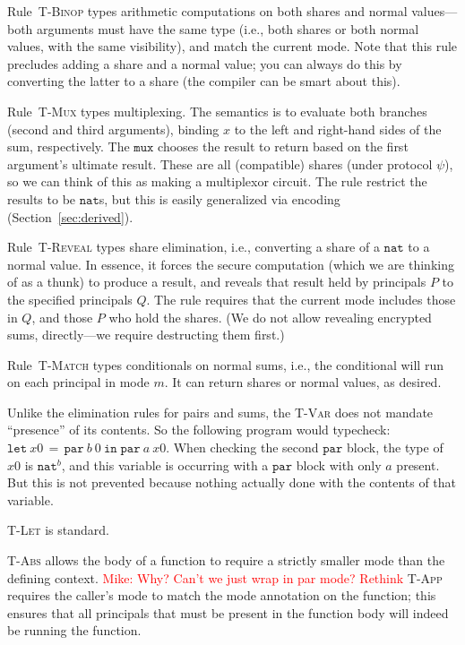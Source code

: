 \documentclass[10pt]{article}
\newcommand{\rulelab}[1]{{\small \textsc{#1}}}
\newcommand{\kw}[1]{\ensuremath{\mathtt{#1}}}
\newcommand{\tnat}{\ensuremath{\mathtt{nat}}}
\newcommand{\elet}[3]{\ensuremath{\kw{let}~#1\, =\, #2~\kw{in}\;{#3}}}
\newcommand{\epar}[2]{\ensuremath{\kw{par}~{#1}~{#2}}}
\newcommand{\mwh}[1]{\textcolor{red}{Mike: #1}}
\begin{document}
Rule~\rulelab{T-Binop} types arithmetic computations on both shares
and normal values---both arguments must have the same type (i.e., both
shares or both normal values, with the same visibility), and match the
current mode. Note that this rule precludes adding a 
share and a normal value; you can always do this by converting the
latter to a share (the compiler can be smart about this).

Rule~\rulelab{T-Mux} types multiplexing. The semantics is to evaluate
both branches (second and third arguments), binding $x$ to the left
and right-hand sides of the sum, respectively. The $\kw{mux}$ chooses
the result to return based on the first argument's ultimate
result. These are all (compatible) shares (under protocol $\psi$), so
we can think of this as making a multiplexor circuit. The rule
restrict the results to be $\tnat$s, but this is easily generalized
via encoding (Section~\ref{sec:derived}).

Rule~\rulelab{T-Reveal} types share elimination, i.e., converting a
share of a $\tnat$ to a normal value. In essence, it forces the secure
computation (which we are thinking of as a thunk) to produce a result,
and reveals that result held by principals $P$ to the specified
principals $Q$. The rule requires that the current mode includes those
in $Q$, and those $P$ who hold the shares. (We do not allow revealing
encrypted sums, directly---we require destructing them first.)

Rule~\rulelab{T-Match} types conditionals on normal sums, i.e., the
conditional will run on each principal in mode $m$. It can return
shares or normal values, as desired. 

Unlike the elimination rules for pairs and sums, the \rulelab{T-Var}
does not mandate ``presence'' of its contents. So the following
program would typecheck: $\elet{x0}{\epar{b}0}{\epar{a}{x0}}$. When
checking the second $\kw{par}$ block, the type of $x0$ is $\tnat^{b}$,
and this variable is occurring with a $\kw{par}$ block with only $a$
present. But this is not prevented because nothing actually done with
the contents of that variable.

\rulelab{T-Let} is standard.

\rulelab{T-Abs} allows the body of a function to require a strictly
smaller mode than the defining context. \mwh{Why? Can't we just wrap
  in par mode? Rethink} \rulelab{T-App} requires the caller's mode to
match the mode annotation on the function; this ensures that all
principals that must be present in the function body will indeed be
running the function.
\end{document}
